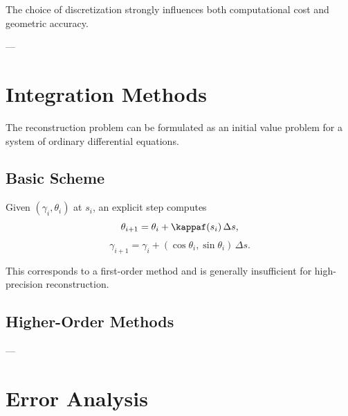 \begin{remark}
The choice of discretization strongly influences both computational cost
and geometric accuracy.
\end{remark}


---

\section{Integration Methods}

\begin{remark}
The reconstruction problem can be formulated as an initial value problem
for a system of ordinary differential equations.
\end{remark}

\subsection{Basic Scheme}

\begin{definition}
Given $(\gamma_i,\theta_i)$ at $s_i$, an explicit step computes
\[
\theta_{i+1} = \theta_i + \kappaf(s_i)\,\Delta s,
\]
\[
\gamma_{i+1} = \gamma_i + (\cos\theta_i,\sin\theta_i)\,\Delta s.
\]
\end{definition}

\begin{remark}
This corresponds to a first-order method and is generally insufficient
for high-precision reconstruction.
\end{remark}

\subsection{Higher-Order Methods}





---

\section{Error Analysis}

